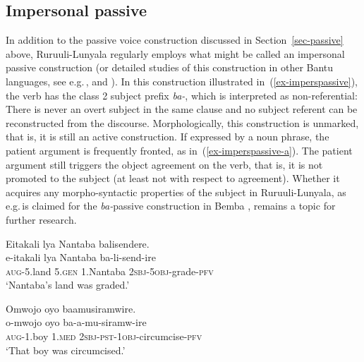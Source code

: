 \subsection{Impersonal passive}\label{sec-impersonal}

In addition to the passive voice construction discussed in Section~\ref{sec-passive} above, Ru\-ruu\-li\hyp{}Lu\-nya\-la regularly employs what might be called an impersonal passive construction (or detailed studies of this construction in other Bantu languages, see e.g.\,\citealt[74–75, 96–97]{Givon1995Functionalism}, \citealt{Kawasha2007Passivization} and \citealt{Kulaetal2010Argument}). 
In this construction illustrated in~(\ref{ex-imperspassive}), the verb has the class 2 subject prefix \emph{ba-}, which is interpreted as non-referential: 
There is never an overt subject in the same clause and no subject referent can be reconstructed from the discourse. 
Morphologically, this construction is unmarked, that is, it is still an active construction. 
If expressed by a noun phrase, the patient argument is frequently fronted, as in~(\ref{ex-imperspassive-a}). 
The patient argument still triggers the object agreement on the verb, that is, it is not promoted to the subject (at least not with respect to agreement). 
Whether it acquires any morpho-syntactic properties of the subject in Ru\-ruu\-li\hyp{}Lu\-nya\-la, as e.g.\,is claimed for the \emph{ba-}passive construction in Bemba \citep{Kulaetal2010Argument}, remains a topic for further research.

\ea \label{ex-imperspassive}
\begin{xlist}

	\ex \label{ex-imperspassive-b}
	\glll Eitakali lya Nantaba balisendere.\\
	  e-itakali lya Nantaba ba-li-send-ire\\
		\textsc{aug}-5.land 5.\textsc{gen} 1.Nantaba \textsc{2sbj}-\textsc{5obj}-grade-\textsc{pfv}\\
	\glt ‘Nantaba's land was graded.’ 
	
	\ex \label{ex-imperspassive-a}
	\glll  Omwojo oyo baamusiramwire.\\
		o-mwojo oyo ba-a-mu-siramw-ire\\
		\textsc{aug}-1.boy 1.\textsc{med} \textsc{2sbj}-\textsc{pst}-\textsc{1obj}-circumcise-\textsc{pfv}\\
	\glt ‘That boy was circumcised.’ 


\end{xlist}
\z

